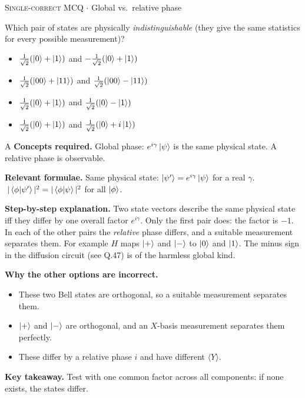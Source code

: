 \documentclass[11pt,a4paper]{article}
\newcommand{\optlabel}[1]{\textbf{(#1)}}
\newcommand{\correctlabel}[1]{\textcolor{okgreen}{\textbf{(#1)}\,\ding{51}}}
\newenvironment{qitem}[1]{\begin{list}{}{\setlength{\leftmargin}{3.3em}\setlength{\labelwidth}{3.1em}%
  \setlength{\labelsep}{0.2em}\setlength{\topsep}{3pt}\setlength{\parsep}{3pt}}\item[\textbf{Q.#1}\hfill]}{\end{list}}
\newcommand{\qsep}{\par\vspace{2pt}{\color{black!15}\hrule}\vspace{4pt}}
\newcommand{\qmeta}[2]{{\footnotesize\color{black!60}\textsc{#1} \;$\cdot$\; #2}\par}
\begin{document}
\begin{qitem}{28}
\qmeta{Single-correct MCQ}{Global vs.\ relative phase}
Which pair of states are physically \emph{indistinguishable} (they give the same statistics for every possible measurement)?
\begin{itemize}[leftmargin=2.6em, labelsep=0.4em, itemsep=2pt, topsep=3pt]
\item[\correctlabel{A}] $\frac{1}{\sqrt2}(\ket0 + \ket1)$ and $-\frac{1}{\sqrt2}(\ket0 + \ket1)$
\item[\optlabel{B}] $\frac{1}{\sqrt2}(\ket{00} + \ket{11})$ and $\frac{1}{\sqrt2}(\ket{00} - \ket{11})$
\item[\optlabel{C}] $\frac{1}{\sqrt2}(\ket0 + \ket1)$ and $\frac{1}{\sqrt2}(\ket0 - \ket1)$
\item[\optlabel{D}] $\frac{1}{\sqrt2}(\ket0 + \ket1)$ and $\frac{1}{\sqrt2}(\ket0 + i\ket1)$
\end{itemize}
\end{qitem}
\begin{solbox}{A}
\textbf{\color{brand}Concepts required.} Global phase: $e^{i\gamma}\ket\psi$ is the same physical state. A relative phase is observable.

\textbf{\color{brand}Relevant formulae.} Same physical state: $\ket{\psi'} = e^{i\gamma}\ket\psi$ for a real $\gamma$. $\;|\braket{\phi|\psi'}|^2 = |\braket{\phi|\psi}|^2$ for all $\ket\phi$.

\textbf{\color{brand}Step-by-step explanation.} Two state vectors describe the same physical state iff they differ by one overall factor $e^{i\gamma}$. Only the first pair does: the factor is $-1$. In each
of the other pairs the \emph{relative} phase differs, and a suitable measurement separates them. For example $H$ maps $\ket{+}$ and $\ket{-}$ to $\ket0$ and $\ket1$.
The minus sign in the diffusion circuit (see Q.47) is of the harmless global kind.

\textbf{\color{brand}Why the other options are incorrect.}
\begin{itemize}[leftmargin=2.4em, itemsep=1pt, topsep=2pt]
\item[\textbf{(B)}] These two Bell states are orthogonal, so a suitable measurement separates them.
\item[\textbf{(C)}] $\ket{+}$ and $\ket{-}$ are orthogonal, and an $X$-basis measurement separates them perfectly.
\item[\textbf{(D)}] These differ by a relative phase $i$ and have different $\langle Y\rangle$.
\end{itemize}
\textbf{\color{brand}Key takeaway.} Test with one common factor across all components: if none exists, the states differ.
\end{solbox}
\qsep
\end{document}
